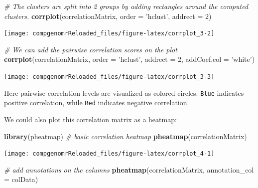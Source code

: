 \documentclass[12pt,]{krantz}
\newenvironment{Shaded}{\begin{snugshade}}{\end{snugshade}}
\newcommand{\CommentTok}[1]{\textcolor[rgb]{0.56,0.35,0.01}{\textit{#1}}}
\newcommand{\DataTypeTok}[1]{\textcolor[rgb]{0.13,0.29,0.53}{#1}}
\newcommand{\DecValTok}[1]{\textcolor[rgb]{0.00,0.00,0.81}{#1}}
\newcommand{\KeywordTok}[1]{\textcolor[rgb]{0.13,0.29,0.53}{\textbf{#1}}}
\newcommand{\NormalTok}[1]{#1}
\newcommand{\StringTok}[1]{\textcolor[rgb]{0.31,0.60,0.02}{#1}}
\begin{document}
\begin{Shaded}
\begin{Highlighting}[]
\CommentTok{# The clusters are split into 2 groups by adding rectangles around the computed clusters. }
\KeywordTok{corrplot}\NormalTok{(correlationMatrix, }\DataTypeTok{order =} \StringTok{'hclust'}\NormalTok{, }\DataTypeTok{addrect =} \DecValTok{2}\NormalTok{)}
\end{Highlighting}
\end{Shaded}

\begin{center}\texttt{[image: compgenomrReloaded\_files/figure-latex/corrplot\_3-2]} \end{center}

\begin{Shaded}
\begin{Highlighting}[]
\CommentTok{# We can add the pairwise correlation scores on the plot}
\KeywordTok{corrplot}\NormalTok{(correlationMatrix, }\DataTypeTok{order =} \StringTok{'hclust'}\NormalTok{, }\DataTypeTok{addrect =} \DecValTok{2}\NormalTok{, }\DataTypeTok{addCoef.col =} \StringTok{'white'}\NormalTok{)}
\end{Highlighting}
\end{Shaded}

\begin{center}\texttt{[image: compgenomrReloaded\_files/figure-latex/corrplot\_3-3]} \end{center}

Here pairwise correlation levels are visualized as colored circles. \texttt{Blue} indicates positive correlation, while \texttt{Red} indicates negative correlation.

We could also plot this correlation matrix as a heatmap:

\begin{Shaded}
\begin{Highlighting}[]
\KeywordTok{library}\NormalTok{(pheatmap)}
\CommentTok{# basic correlation heatmap}
\KeywordTok{pheatmap}\NormalTok{(correlationMatrix)}
\end{Highlighting}
\end{Shaded}

\begin{center}\texttt{[image: compgenomrReloaded\_files/figure-latex/corrplot\_4-1]} \end{center}

\begin{Shaded}
\begin{Highlighting}[]
\CommentTok{# add annotations on the columns}
\KeywordTok{pheatmap}\NormalTok{(correlationMatrix, }\DataTypeTok{annotation_col =}\NormalTok{ colData)}
\end{Highlighting}
\end{Shaded}
\end{document}
